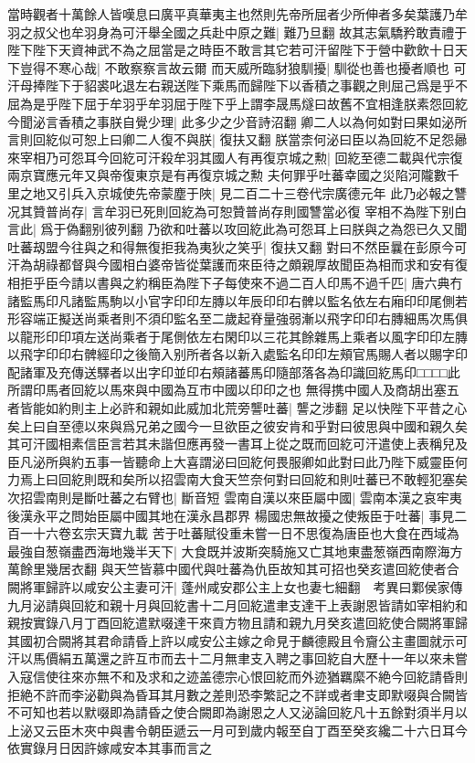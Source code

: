 當時觀者十萬餘人皆嘆息曰廣平真華夷主也然則先帝所屈者少所伸者多矣葉護乃牟羽之叔父也牟羽身為可汗舉全國之兵赴中原之難|{
	難乃旦翻}
故其志氣驕矜敢責禮于陛下陛下天資神武不為之屈當是之時臣不敢言其它若可汗留陛下于營中歡飲十日天下豈得不寒心哉|{
	不敢察察言故云爾}
而天威所臨豺狼馴擾|{
	馴從也善也擾者順也}
可汗母捧陛下于貂裘叱退左右親送陛下乘馬而歸陛下以香積之事觀之則屈己爲是乎不屈為是乎陛下屈于牟羽乎牟羽屈于陛下乎上謂李晟馬燧曰故舊不宜相逢朕素怨回紇今聞泌言香積之事朕自覺少理|{
	此多少之少音詩沼翻}
卿二人以為何如對曰果如泌所言則回紇似可恕上曰卿二人復不與朕|{
	復扶又翻}
朕當柰何泌曰臣以為回紇不足怨曏來宰相乃可怨耳今回紇可汗殺牟羽其國人有再復京城之勲|{
	回紇至德二載與代宗復兩京寶應元年又與帝復東京是有再復京城之勲}
夫何罪乎吐蕃幸國之災陷河隴數千里之地又引兵入京城使先帝蒙塵于陜|{
	見二百二十三卷代宗廣德元年}
此乃必報之讐况其贊普尚存|{
	言牟羽已死則回紇為可恕贊普尚存則國讐當必復}
宰相不為陛下别白言此|{
	爲于偽翻别彼列翻}
乃欲和吐蕃以攻回紇此為可怨耳上曰朕與之為怨已久又聞吐蕃刼盟今往與之和得無復拒我為夷狄之笑乎|{
	復扶又翻}
對曰不然臣曩在彭原今可汗為胡祿都督與今國相白婆帝皆從葉護而來臣待之頗親厚故聞臣為相而求和安有復相拒乎臣今請以書與之約稱臣為陛下子每使來不過二百人印馬不過千匹|{
	唐六典冇諸監馬印凡諸監馬駒以小官字印印左膞以年辰印印右髀以監名依左右廂印印尾側若形容端正擬送尚乘者則不須印監名至二歲起脊量強弱漸以飛字印印右膞細馬次馬俱以龍形印印項左送尚乘者于尾側依左右閑印以三花其餘雜馬上乘者以風字印印左膞以飛字印印右髀經印之後簡入别所者各以新入處監名印印左頰官馬賜人者以賜字印配諸軍及充傳送驛者以出字印並印右頰諸蕃馬印隨部落各為印識回紇馬印□□□□此所謂印馬者回紇以馬來與中國為互市中國以印印之也}
無得携中國人及商胡出塞五者皆能如約則主上必許和親如此威加北荒旁讋吐蕃|{
	讋之涉翻}
足以快陛下平昔之心矣上曰自至德以來與爲兄弟之國今一旦欲臣之彼安肯和乎對曰彼思與中國和親久矣其可汗國相素信臣言若其未諧但應再發一書耳上從之既而回紇可汗遣使上表稱兒及臣凡泌所與約五事一皆聽命上大喜謂泌曰回紇何畏服卿如此對曰此乃陛下威靈臣何力焉上曰回紇則既和矣所以招雲南大食天竺奈何對曰回紇和則吐蕃已不敢輕犯塞矣次招雲南則是斷吐蕃之右臂也|{
	斷音短}
雲南自漢以來臣屬中國|{
	雲南本漢之哀牢夷後漢永平之問始臣屬中國其地在漢永昌郡界}
楊國忠無故擾之使叛臣于吐蕃|{
	事見二百一十六卷玄宗天寶九載}
苦于吐蕃賦役重未嘗一日不思復為唐臣也大食在西域為最強自葱嶺盡西海地幾半天下|{
	大食既并波斯突騎施又亡其地東盡葱嶺西南際海方萬餘里幾居衣翻}
與天竺皆慕中國代與吐蕃為仇臣故知其可招也癸亥遣回紇使者合闕將軍歸許以咸安公主妻可汗|{
	蓬州咸安郡公主上女也妻七細翻　考異曰鄴侯家傳九月泌請與回紇和親十月與回紇書十二月回紇遣聿支達干上表謝恩皆請如宰相約和親按實錄八月丁酉回紇遣默啜達干來貢方物且請和親九月癸亥遣回紇使合闕將軍歸其國初合闕將其君命請昏上許以咸安公主嫁之命見于麟德殿且令齎公主畫圖就示可汗以馬價絹五萬還之許互市而去十二月無聿支入聘之事回紇自大歷十一年以來未嘗入寇信使往來亦無不和及求和之迹盖德宗心恨回紇而外迹猶羈縻不絶今回紇請昏則拒絶不許而李泌勸與為昏耳其月數之差則恐李繁記之不詳或者聿支即默啜與合闕皆不可知也若以默啜即為請昏之使合闕即為謝恩之人又泌論回紇凡十五餘對須半月以上泌又云臣木夾中與書令朝臣遞云一月可到歲内報至自丁酉至癸亥纔二十六日耳今依實錄月日因許嫁咸安本其事而言之}
